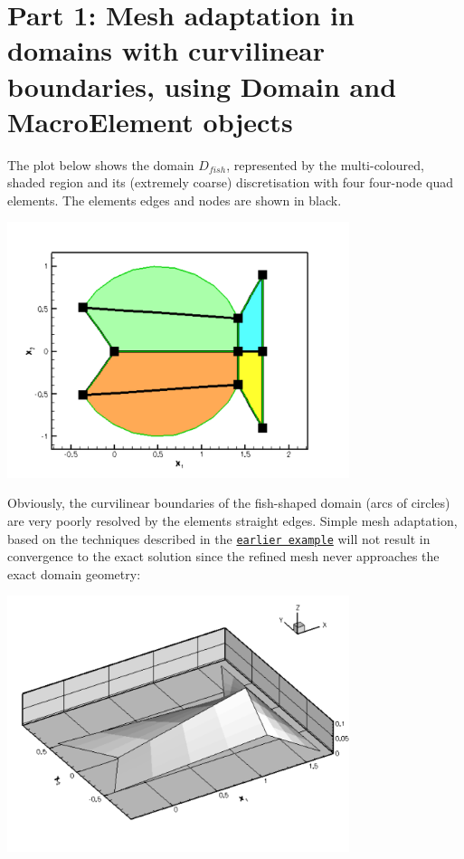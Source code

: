 \hypertarget{index_adapt}{}\section{Part 1\+: Mesh adaptation in domains with curvilinear boundaries, using Domain and Macro\+Element objects}\label{index_adapt}
The plot below shows the domain $D_{fish} $, represented by the multi-\/coloured, shaded region and its (extremely coarse) discretisation with four four-\/node quad elements. The elements\textquotesingle{} edges and nodes are shown in black.

 
\begin{DoxyImage}
\includegraphics[width=0.75\textwidth]{coarse_fish_mesh_and_domain}
\end{DoxyImage}


Obviously, the curvilinear boundaries of the fish-\/shaped domain (arcs of circles) are very poorly resolved by the elements\textquotesingle{} straight edges. Simple mesh adaptation, based on the techniques described in the \href{../../../../doc/poisson/two_d_poisson_adapt/html/index.html}{\tt earlier example} will not result in convergence to the exact solution since the refined mesh never approaches the exact domain geometry\+:

 
\begin{DoxyImage}
\includegraphics[width=0.75\textwidth]{fish_poisson_soln_no_macro}
\end{DoxyImage}


